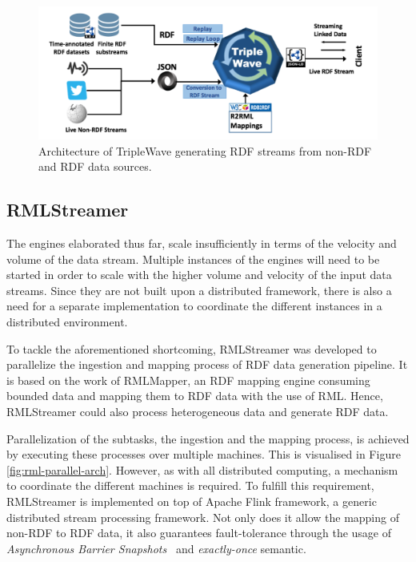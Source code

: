 \begin{figure}[!htbp]
  \centering
  \includegraphics[width=\textwidth]{fig/triple-wave-arch.png}
  \caption{Architecture of TripleWave generating RDF streams from non-RDF and RDF data sources\cite{triple_wave}. }
  \label{fig:triple-wave-arch}
\end{figure}

\subsection{RMLStreamer}
The engines elaborated thus far, scale insufficiently in terms of the velocity and 
volume of the data stream. Multiple instances of the engines will need to 
be started in order to scale with the higher volume and velocity of 
the input data streams. Since they are not built upon a distributed framework, 
there is also a need for a separate implementation to coordinate the different 
instances in a distributed environment. 

To tackle the aforementioned shortcoming, RMLStreamer\cite{rml_streamer}
was developed to parallelize the ingestion and mapping process of RDF data generation pipeline. 
It is based on the work of RMLMapper\cite{rml}, an RDF mapping engine consuming bounded data and 
mapping them to RDF data with the use of RML. Hence, RMLStreamer could also 
process heterogeneous data and generate RDF data. 

Parallelization of the subtasks, the ingestion and the mapping process, is achieved by executing 
these processes over multiple machines. This is visualised in 
Figure \ref{fig:rml-parallel-arch}.  However, as with all distributed 
computing, a mechanism to coordinate the different machines is required. 
To fulfill this requirement, RMLStreamer is 
implemented on top of Apache Flink\cite{flink} framework, a generic distributed stream 
processing framework. Not only does it allow the mapping 
of non-RDF to RDF data, it also guarantees fault-tolerance through the usage of 
\emph{Asynchronous Barrier Snapshots}~\cite{flink_fault_tolerance} and \emph{exactly-once} semantic. 


